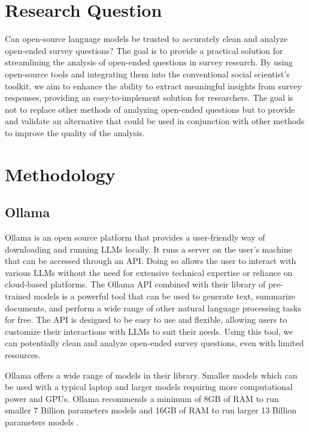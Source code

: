 \documentclass[
  authoryear,
  preprint,
  3p]{elsarticle}
\begin{document}
\section{Research Question}\label{research-question}

Can open-source language models be trusted to accurately clean and
analyze open-ended survey questions? The goal is to provide a practical
solution for streamlining the analysis of open-ended questions in survey
research. By using open-source tools and integrating them into the
conventional social scientist's toolkit, we aim to enhance the ability
to extract meaningful insights from survey responses, providing an
easy-to-implement solution for researchers. The goal is not to replace
other methods of analyzing open-ended questions but to provide and
validate an alternative that could be used in conjunction with other
methods to improve the quality of the analysis.

\section{Methodology}\label{methodology}

\subsection{Ollama}\label{ollama}

Ollama is an open source platform that provides a user-friendly way of
downloading and running LLMs locally. It runs a server on the user's
machine that can be accessed through an API. Doing so allows the user to
interact with various LLMs without the need for extensive technical
expertise or reliance on cloud-based platforms. The Ollama API combined
with their library of pre-trained models is a powerful tool that can be
used to generate text, summarize documents, and perform a wide range of
other natural language processing tasks for free. The API is designed to
be easy to use and flexible, allowing users to customize their
interactions with LLMs to suit their needs. Using this tool, we can
potentially clean and analyze open-ended survey questions, even with
limited resources.

Ollama offers a wide range of models in their library. Smaller models
which can be used with a typical laptop and larger models requiring more
computational power and GPUs. Ollama recommends a minimum of 8GB of RAM
to run smaller 7 Billion parameters models and 16GB of RAM to run larger
13 Billion parameters models \citep{ollama24}.
\end{document}
